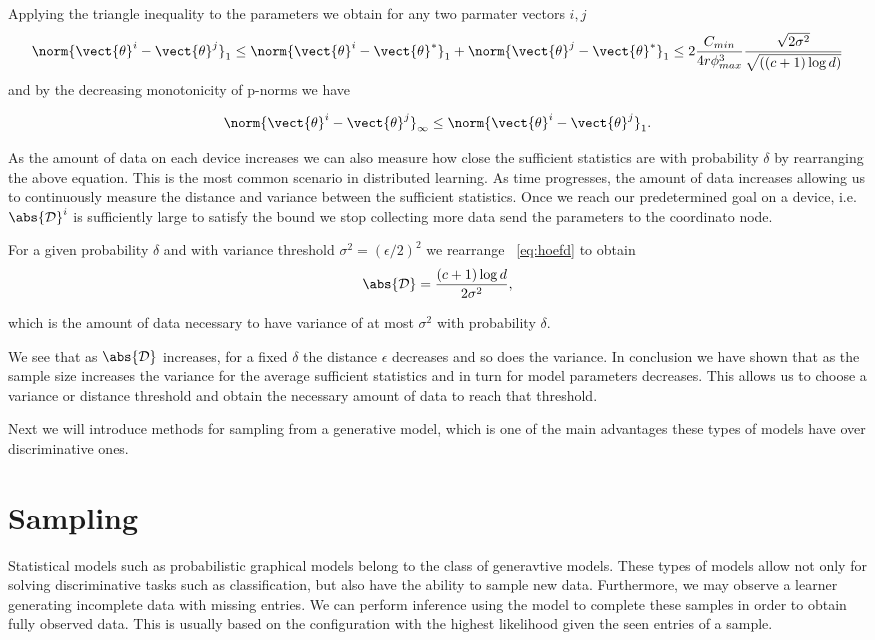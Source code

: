 Applying the triangle inequality to the parameters we obtain for any two parmater vectors $i,j$
\begin{equation}
    \norm{\vect{\theta}^i- \vect{\theta}^j}_1 \leq  \norm{\vect{\theta}^i - \vect{\theta}^*}_1  +  \norm{\vect{\theta}^j- \vect{\theta}^*}_1 \leq 2 \frac{C_{min}}{4r\phi^3_{max}} \frac{\sqrt{2\sigma^2}}{\sqrt{((c+1) \log d)}}
\end{equation}
and by the decreasing monotonicity of p-norms \cite{raissouli2010various} we have

\begin{equation}
    \norm{\vect{\theta}^i- \vect{\theta}^j}_{\infty}  \leq \norm{\vect{\theta}^i- \vect{\theta}^j}_1.
\end{equation}

As the amount of data on each device increases we can also measure how close the sufficient statistics are with probability $\delta$ by rearranging the above equation. 
This is the most common scenario in distributed learning. 
As time progresses, the amount of data increases allowing us to continuously measure the distance and variance between the sufficient statistics.
Once we reach our predetermined goal on a device, i.e. $\abs{\mathcal{D}}^i$ is sufficiently large to satisfy the bound we stop collecting more data send the parameters to the coordinato node.

For a given probability $\delta$ and with variance threshold $\sigma^2 = (\epsilon/2)^2$ we rearrange \eq~\ref{eq:hoefd} to obtain 
\begin{equation}
    \abs{\mathcal{D}} = \frac{(c+1) \log d}{2 \sigma^2},
\end{equation}

which is the amount of data necessary to have variance  of at most $\sigma^2$ with probability $\delta$.

We see that as $\abs{\mathcal{D}}$ increases, for a fixed $\delta$ the distance $\epsilon$ decreases and so does the variance. 
In conclusion we have shown that as the sample size increases the variance for the average sufficient statistics and in turn for model parameters decreases.
This allows us to choose a variance or distance threshold and obtain the necessary amount of data to reach that threshold.

Next we will introduce methods for sampling from a generative model, which is one of the main advantages these types of models have over discriminative ones.

\section{Sampling}
Statistical models such as probabilistic graphical models belong to the class of generavtive models.
These types of models allow not only for solving discriminative tasks such as classification, but also have the ability to sample new data.
Furthermore, we may observe a learner generating incomplete data with missing entries.
We can perform inference using the model to complete these samples in order to obtain fully observed data.
This is usually based on the configuration with the highest likelihood given the seen entries of a sample.

